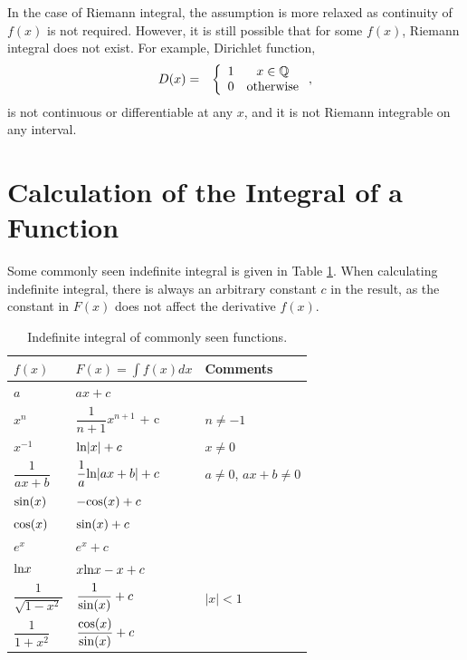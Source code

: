 In the case of Riemann integral, the assumption is more relaxed as continuity of $f(x)$ is not required. However, it is still possible that for some $f(x)$, Riemann integral does not exist. For example, Dirichlet function,
\begin{eqnarray}
    D(x) &=& \left\{\begin{array}{cc}
        1 & x \in \mathbb{Q} \\
        0 & \textup{otherwise}
    \end{array}\right.,
\end{eqnarray}
is not continuous or differentiable at any $x$, and it is not Riemann integrable on any interval.

\section{Calculation of the Integral of a Function} \label{ch3sec:calculateintegraloffunc}

Some commonly seen indefinite integral is given in Table \ref{chi3table:commonintegrals}. When calculating indefinite integral, there is always an arbitrary constant $c$ in the result, as the constant in $F(x)$ does not affect the derivative $f(x)$.
\begin{table}
\centering\caption{Indefinite integral of commonly seen functions.} \label{chi3table:commonintegrals}
\begin{tabular}{lll}
\hline
{$f(x)$} & {$F(x) = \int f(x)dx$} & Comments  \\ \hline
$a$ & $ax + c$ & \\
$x^n$ & $\dfrac{1}{n+1}x^{n+1}$ + c & $n\neq -1$ \\
$x^{-1}$ & $\textup{ln}|x| + c$ & $x \neq 0$  \\
$\dfrac{1}{ax+b}$ & $\dfrac{1}{a}\textup{ln}|ax+b| + c$ & $a\neq 0$, $ax+b\neq 0$ \\
$\textup{sin}(x)$ & $-\textup{cos}(x) + c$ & \\
$\textup{cos}(x)$ & $\textup{sin}(x) + c$ & \\
$e^x$ & $e^x + c$ & \\
$\textup{ln}x$ & $x\textup{ln}x - x + c$ & \\
$\dfrac{1}{\sqrt{1-x^2}}$ & $\dfrac{1}{\textup{sin}(x)} + c$ & $|x|<1$\\
$\dfrac{1}{1+x^2}$ & $\dfrac{\textup{cos}(x)}{\textup{sin}(x)}+c$ & \\ \hline
\end{tabular}
\end{table}


